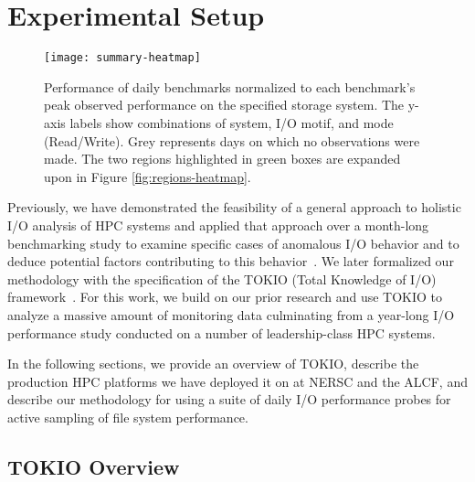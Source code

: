 \section{Experimental Setup}\label{sec:methods}

\begin{figure*}[t]
    \centering
    \texttt{[image: summary-heatmap]}
    \vspace{-.2in}
    \caption{Performance of daily benchmarks normalized to each benchmark's peak observed performance on the specified storage system.  The y-axis labels show combinations of system, I/O motif, and mode (Read/Write).  Grey represents days on which no observations were made.  The two regions highlighted in green boxes are expanded upon in Figure \ref{fig:regions-heatmap}.}
    \label{fig:summary-heatmap}
\end{figure*}



Previously, we have demonstrated the feasibility of a general approach to holistic I/O analysis of HPC systems and applied that approach over a month-long benchmarking study to examine specific cases of anomalous I/O behavior and to deduce potential factors contributing to this behavior~\cite{Lockwood2017}. We later formalized our methodology with the specification of the TOKIO (Total Knowledge of I/O) framework~\cite{Lockwood2018tokio}. For this work, we build on our prior research and use TOKIO to analyze a massive amount of monitoring data culminating from a year-long I/O performance study conducted on a number of leadership-class HPC systems. 

In the following sections, we provide an overview of TOKIO, describe the production HPC platforms we have deployed it on at NERSC and the ALCF, and describe our methodology for using a suite of daily I/O performance probes for active sampling of file system performance.

\subsection{TOKIO Overview}\label{sec:methods/tokio}

